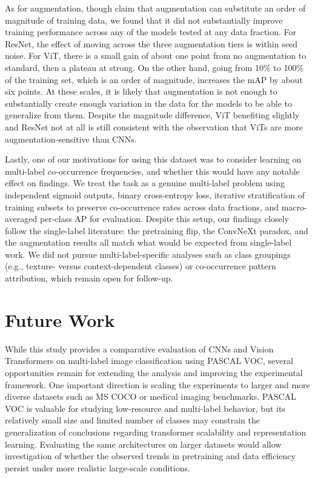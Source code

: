 \documentclass{article}
\begin{document}
As for augmentation, though \citet{steiner2022} claim that augmentation
can substitute an order of magnitude of training data, we found that it
did not substantially improve training performance across any of the
models tested at any data fraction. For ResNet, the effect of moving
across the three augmentation tiers is within seed noise. For ViT,
there is a small gain of about one point from no augmentation to
standard, then a plateau at strong. On the other hand, going from
10\% to 100\% of the training set, which is an order of magnitude,
increases the mAP by about six points. At these scales, it is likely
that augmentation is not enough to substantially create enough
variation in the data for the models to be able to generalize from
them. Despite the magnitude difference, ViT benefiting slightly and
ResNet not at all is still consistent with the observation that ViTs
are more augmentation-sensitive than CNNs.

Lastly, one of our motivations for using this dataset was to consider
learning on multi-label co-occurrence frequencies, and whether this
would have any notable effect on findings. We treat the task as a
genuine multi-label problem using independent sigmoid outputs, binary
cross-entropy loss, iterative stratification of training subsets to
preserve co-occurrence rates across data fractions, and macro-averaged
per-class AP for evaluation. Despite this setup, our findings closely
follow the single-label literature: the pretraining flip, the ConvNeXt
paradox, and the augmentation results all match what would be expected
from single-label work. We did not pursue multi-label-specific analyses
such as class groupings (e.g., texture- versus context-dependent
classes) or co-occurrence pattern attribution, which remain open for
follow-up.


\section{Future Work}

While this study provides a comparative evaluation of CNNs and Vision Transformers on multi-label image classification using PASCAL VOC, several opportunities remain for extending the analysis and improving the experimental framework. One important direction is scaling the experiments to larger and more diverse datasets such as MS COCO or medical imaging benchmarks. PASCAL VOC is valuable for studying low-resource and multi-label behavior, but its relatively small size and limited number of classes may constrain the generalization of conclusions regarding transformer scalability and representation learning. Evaluating the same architectures on larger datasets would allow investigation of whether the observed trends in pretraining and data efficiency persist under more realistic large-scale conditions.
\end{document}
